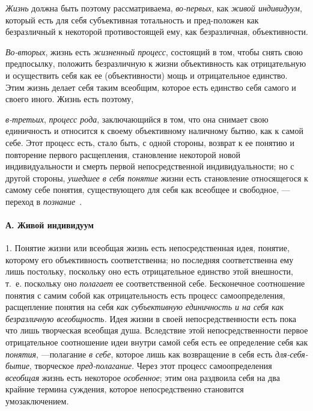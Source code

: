 \documentclass[twoside]{article}
\begin{document}
{{{{\em Жизнь} должна быть
поэтому рассматриваема,
{\em во-первых}, как
{\em живой индивидуум},
который есть для себя субъективная тотальность и пред-положен
как безразличный к некоторой противостоящей ему, как безразличная,
объективности.

{\em Во-вторых}, жизнь есть
{\em жизненный процесс},
состоящий в том, чтобы снять свою предпосылку, положить
безразличную к жизни объективность как отрицательную и осуществить себя как
ее (объективности) мощь и отрицательное единство. Этим жизнь делает себя
таким всеобщим, которое есть единство себя самого и своего иного. Жизнь
есть поэтому,

{\em в-третьих},
{\em процесс рода},
заключающийся в том, что она снимает свою единичность и
относится к своему объективному наличному бытию, как к самой себе. Этот
процесс есть, стало быть, с одной стороны, возврат к ее понятию и
повторение первого расщепления, становление некоторой новой
индивидуальности и смерть первой непосредственной индивидуальности; но с
другой стороны, {\em ушедшее в себя
понятие} жизни есть становление относящегося к самому себе
понятия, существующего для себя как всеобщее и свободное, —
переход в
{\em познание}~\label{bkm:bm93}.

\paragraph[А. Живой индивидуум]{А. Живой индивидуум}
1. Понятие жизни или всеобщая жизнь есть непосредственная
идея, понятие, которому его объективность соответственна; но последняя
соответственна ему лишь постольку, поскольку оно есть отрицательное
единство этой внешности, т.~е. поскольку оно
{\em полагает} ее
соответственной себе. Бесконечное соотношение понятия с самим собой как
отрицательность есть процесс самоопределения, расщепление понятия на себя
{\em как субъективную единичность и на
себя как безразличную всеобщность.} Идея жизни в своей
непосредственности есть пока что лишь творческая всеобщая душа. Вследствие
этой непосредственности первое отрицательное соотношение идеи внутри самой
себя есть ее определение себя как
{\em понятия}, —полагание
{\em в себе}, которое
лишь как возвращение в себя есть
{\em для-себя-бытие},
творческое
{\em пред-полагание}.
Через этот процесс самоопределения
{\em всеобщая} жизнь есть
некоторое {\em особенное};
этим она раздвоила себя на два крайние термина суждения,
которое непосредственно становится умозаключением.

}}}
\end{document}
